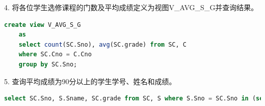 \documentclass[12pt, a4paper]{report}
\begin{document}
4. 将各位学生选修课程的门数及平均成绩定义为视图V\_AVG\_S\_G并查询结果。\\

\begin{lstlisting}[language=SQL]
    create view V_AVG_S_G
    as
    select count(SC.Sno), avg(SC.grade) from SC, C
    where SC.Cno = C.Cno
    group by SC.Sno;
\end{lstlisting}

\begin{figure}[H] %
    \centering %
\end{figure}

5. 查询平均成绩为90分以上的学生学号、姓名和成绩。\\

\begin{lstlisting}[language=SQL]
    select SC.Sno, S.Sname, SC.grade from SC, S where S.Sno = SC.Sno in (select SC.Sno from SC group by SC.Sno having avg(SC.grade) > 90);
\end{lstlisting}

\begin{figure}[H] %
    \centering %
\end{figure}
\end{document}
